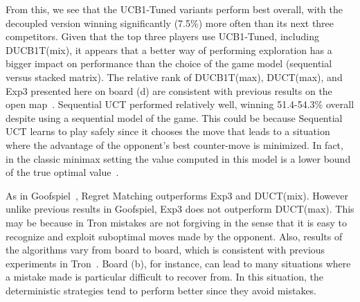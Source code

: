 \documentclass{article}
\begin{document}
From this, we see that the UCB1-Tuned variants perform best overall, with the decoupled version 
winning significantly (7.5\%) more often than its next three competitors. 
Given that the top three players use UCB1-Tuned, including DUCB1T(mix), it appears that a better way of 
performing exploration has a bigger impact on performance than the choice of the game model 
(sequential versus stacked matrix).
The relative rank of DUCB1T(max), DUCT(max), and Exp3 presented here on board (d) are consistent with 
previous results on the open map~\cite{cig_paper}. 
Sequential UCT performed relatively well, winning 51.4-54.3\% overall despite using a 
sequential model of the game. 
This could be because Sequential UCT learns to play safely since it chooses the move that leads to a situation
where the advantage of the opponent's best counter-move is minimized. In fact, in the classic minimax setting the 
value computed in this model 
is a lower bound of the true optimal value~\cite{Bosansky13Using}. 

As in Goofspiel~\cite{mcts_goofspiel}, Regret Matching outperforms Exp3 and DUCT(mix). 
However unlike previous results in Goofspiel, Exp3 does not outperform 
DUCT(max). This may be because in Tron mistakes are not forgiving in the sense that it is easy to 
recognize and exploit suboptimal moves made by the opponent. 
Also, results of the algorithms vary from board to board, which is consistent with previous 
experiments in Tron~\cite{teuling_tron}. Board (b), for instance, can lead to many situations where 
a mistake made is particular difficult to recover from. In this situation, the deterministic strategies
tend to perform better since they avoid mistakes. 

\end{document}
